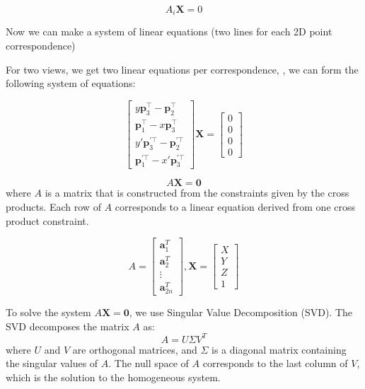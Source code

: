 \[
	A_i \mathbf{X} = 0
\]

Now we can make a system of linear equations (two lines for each 2D point correspondence)

For two views, we get two linear equations per correspondence, , we can form the following system of equations:

\[
	\begin{bmatrix}
		y \mathbf{p}_3^{\top} - \mathbf{p}_2^{\top}                \\
		\mathbf{p}_1^{\top} - x \mathbf{p}_3^{\top}                \\
		y' \mathbf{p}_3^{\prime \top} - \mathbf{p}_2^{\prime \top} \\
		\mathbf{p}_1^{\prime \top} - x' \mathbf{p}_3^{\prime \top}
	\end{bmatrix} \mathbf{X} = \begin{bmatrix} 0 \\ 0 \\ 0 \\ 0 \end{bmatrix}
\]

\[
	A \mathbf{X} = \mathbf{0}
\]
where \( A \) is a matrix that is constructed from the constraints given by the cross products. Each row of \( A \) corresponds to a linear equation derived from one cross product constraint.

\[
	A = \begin{bmatrix} \mathbf{a}_1^T \\ \mathbf{a}_2^T \\ \vdots \\ \mathbf{a}_{2n}^T \end{bmatrix}
	,
	\mathbf{X} = \begin{bmatrix} X \\ Y \\ Z \\ 1 \end{bmatrix}
\]



To solve the system \( A \mathbf{X} = \mathbf{0} \), we use Singular Value Decomposition (SVD). The SVD decomposes the matrix \( A \) as:
\[
	A = U \Sigma V^T
\]
where \( U \) and \( V \) are orthogonal matrices, and \( \Sigma \) is a diagonal matrix containing the singular values of \( A \). The null space of \( A \) corresponds to the last column of \( V \), which is the solution to the homogeneous system.

